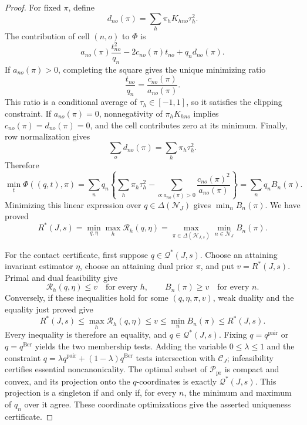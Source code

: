 \documentclass{article}
\begin{document}
\begin{proof}
For fixed \(\pi\), define
\[
 d_{no}(\pi)=\sum_h\pi_hK_{hno}\tau_h^2.
\]
The contribution of cell \((n,o)\) to \(\Phi\) is
\[
 a_{no}(\pi)\frac{t_{no}^2}{q_n}-2c_{no}(\pi)t_{no}+q_nd_{no}(\pi).
\]
If \(a_{no}(\pi)>0\), completing the square gives the unique minimizing ratio
\[
 \frac{t_{no}}{q_n}=\frac{c_{no}(\pi)}{a_{no}(\pi)}.
\]
This ratio is a conditional average of \(\tau_h\in[-1,1]\), so it satisfies the clipping constraint. If \(a_{no}(\pi)=0\), nonnegativity of \(\pi_hK_{hno}\) implies \(c_{no}(\pi)=d_{no}(\pi)=0\), and the cell contributes zero at its minimum. Finally, row normalization gives
\[
 \sum_o d_{no}(\pi)=\sum_h\pi_h\tau_h^2.
\]
Therefore
\[
 \min_t\Phi((q,t),\pi)
 =\sum_nq_n\left\{\sum_h\pi_h\tau_h^2-
 \sum_{o:a_{no}(\pi)>0}\frac{c_{no}(\pi)^2}{a_{no}(\pi)}\right\}
 =\sum_nq_nB_n(\pi).
\]
Minimizing this linear expression over \(q\in\Delta(\mathcal N_J)\) gives \(\min_nB_n(\pi)\). We have proved
\[
 R^*(J,s)=\min_{q,\eta}\max_h\mathcal R_h(q,\eta)
 =\max_{\pi\in\Delta(\mathcal H_{J,s})}\min_{n\in\mathcal N_J}B_n(\pi).
\]

For the contact certificate, first suppose \(q\in\mathcal Q^*(J,s)\). Choose an attaining invariant estimator \(\eta\), choose an attaining dual prior \(\pi\), and put \(v=R^*(J,s)\). Primal and dual feasibility give
\[
 \mathcal R_h(q,\eta)\le v\quad\text{for every }h,
 \qquad
 B_n(\pi)\ge v\quad\text{for every }n.
\]
Conversely, if these inequalities hold for some \((q,\eta,\pi,v)\), weak duality and the equality just proved give
\[
 R^*(J,s)\le\max_h\mathcal R_h(q,\eta)\le v
 \le\min_nB_n(\pi)\le R^*(J,s).
\]
Every inequality is therefore an equality, and \(q\in\mathcal Q^*(J,s)\). Fixing \(q=q^{\mathrm{pair}}\) or \(q=q^{\mathrm{Ber}}\) yields the two membership tests. Adding the variable \(0\le\lambda\le1\) and the constraint \(q=\lambda q^{\mathrm{pair}}+(1-\lambda)q^{\mathrm{Ber}}\) tests intersection with \(\mathcal C_J\); infeasibility certifies essential noncanonicality. The optimal subset of \(\mathcal P_{\mathrm{pr}}\) is compact and convex, and its projection onto the \(q\)-coordinates is exactly \(\mathcal Q^*(J,s)\). This projection is a singleton if and only if, for every \(n\), the minimum and maximum of \(q_n\) over it agree. These coordinate optimizations give the asserted uniqueness certificate.
\end{proof}
\end{document}
